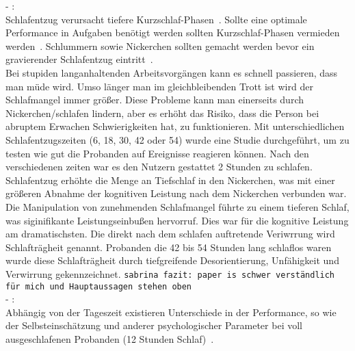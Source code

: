 - \cite{dinges1985assessing}:\\
Schlafentzug verursacht tiefere Kurzschlaf-Phasen~\cite{dinges1985assessing}. Sollte eine optimale Performance in Aufgaben benötigt werden sollten Kurzschlaf-Phasen vermieden werden~\cite{dinges1985assessing}. Schlummern sowie Nickerchen sollten gemacht werden bevor ein gravierender Schlafentzug eintritt~\cite{dinges1985assessing}.\\
Bei stupiden langanhaltenden Arbeitsvorgängen kann es schnell passieren, dass man müde wird. Umso länger man im gleichbleibenden Trott ist wird der Schlafmangel immer größer. Diese Probleme kann man einerseits durch Nickerchen/schlafen lindern, aber es erhöht das Risiko, dass die Person bei abruptem Erwachen Schwierigkeiten hat, zu funktionieren. Mit unterschiedlichen Schlafentzugszeiten (6, 18, 30, 42 oder 54) wurde eine Studie durchgeführt, um zu testen wie gut die Probanden auf Ereignisse reagieren können. Nach den verschiedenen zeiten war es den Nutzern gestattet 2 Stunden zu schlafen. Schlafentzug erhöhte die Menge an Tiefschlaf in den Nickerchen, was mit einer größeren Abnahme der kognitiven Leistung nach dem Nickerchen verbunden war.\\
Die Manipulation von zunehmenden Schlafmangel führte zu einem tieferen Schlaf, was siginifikante Leistungseinbußen hervorruf. Dies war für die kognitive Leistung am dramatischsten. Die direkt nach dem schlafen auftretende Veriwrrung wird Schlafträgheit genannt. Probanden die 42 bis 54 Stunden lang schlaflos waren wurde diese Schlafträgheit durch tiefgreifende Desorientierung, Unfähigkeit und Verwirrung gekennzeichnet.
\texttt{sabrina fazit: paper is schwer verständlich für mich und Hauptaussagen stehen oben}\\

- \cite{kraemer2000time}:\\
Abhängig von der Tageszeit existieren Unterschiede in der Performance, so wie der Selbsteinschätzung und anderer psychologischer Parameter bei voll ausgeschlafenen Probanden (12 Stunden Schlaf)~\cite{kraemer2000time}.\\

